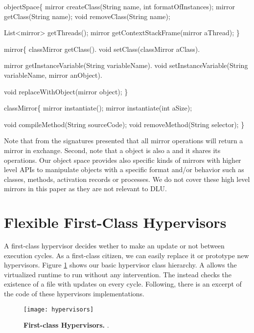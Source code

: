 \begin{code}
objectSpace\{
    mirror createClass(String name, int formatOfInstances);
    mirror getClass(String name);
    void removeClass(String name);
    
    List<mirror> getThreads();
    mirror getContextStackFrame(mirror aThread);
\}

mirror\{
    classMirror getClass().
    void setClass(classMirror aClass).

    mirror getInstanceVariable(String variableName).
    void setInstanceVariable(String variableName, mirror anObject).
    
    void replaceWithObject(mirror object);
\}

classMirror\{
    mirror instantiate();
    mirror instantiate(int aSize);
    
    void compileMethod(String sourceCode);
    void removeMethod(String selector);
\}
\end{code}

Note that from the signatures presented that all mirror operations will return a mirror in exchange. Second, note that a  object is also a  and it shares its operations.
Our object space provides also specific kinds of mirrors with higher level APIs to manipulate objects with a specific format and/or behavior such as classes, methods, activation records or processes. We do not cover these high level mirrors in this paper as they are not relevant to DLU.


\section{Flexible First-Class Hypervisors}\label{sec:hypervisor}

A first-class hypervisor decides wether to make an update or not between execution cycles. As a first-class citizen, we can easily replace it or prototype new hypervisors. Figure \ref{fig:hypervisors} shows our basic hypervisor class hierarchy. A  allows the virtualized runtime to run without any intervention. The  instead checks the existence of a file with updates on every cycle. Following, there is an excerpt of the code of these hypervisors implementations.

\begin{figure}[ht]
\center
\texttt{[image: hypervisors]}
\caption{\textbf{First-class Hypervisors.} .\label{fig:hypervisors}}
\end{figure}

